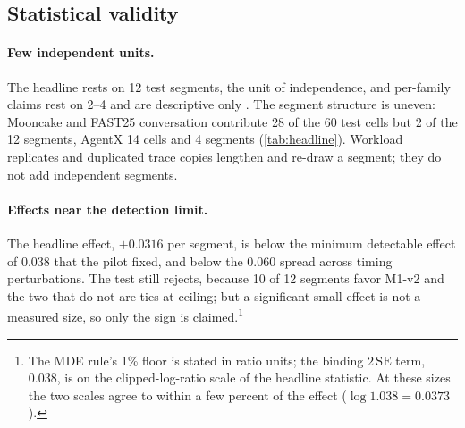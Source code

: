 \subsection{Statistical validity}
\label{sec:threats-stats}

\paragraph{Few independent units.}
The headline rests on 12 test segments, the unit of independence, and per-family claims rest on 2--4
and are descriptive only \citep{demsar2006}. The segment structure is uneven: Mooncake and FAST25
conversation contribute 28 of the 60 test cells but 2 of the 12 segments, AgentX 14 cells and 4
segments (\cref{tab:headline}). Workload replicates and duplicated trace copies lengthen and
re-draw a segment; they do not add independent segments.

\paragraph{Effects near the detection limit.}
The headline effect, $+0.0316$ per segment, is below the minimum detectable effect of 0.038 that the
pilot fixed, and below the 0.060 spread across timing perturbations. The test still rejects, because
10 of 12 segments favor M1-v2 and the two that do not are ties at ceiling; but a significant small
effect is not a measured size, so only the sign is claimed.\footnote{The MDE rule's 1\% floor is
  stated in ratio units; the binding $2\,\mathrm{SE}$ term, 0.038, is on the clipped-log-ratio scale of
  the headline statistic. At these sizes the two scales agree to within a few percent of the effect
  ($\log 1.038 = 0.0373$).}

